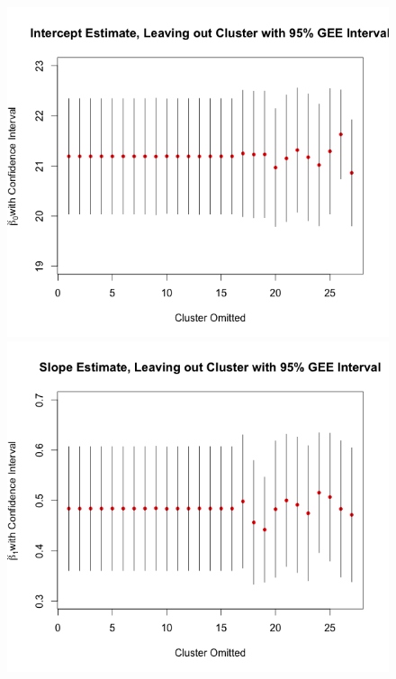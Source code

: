 \documentclass[11pt]{article}
\begin{document}
\begin{enumerate}
\begin{figure}[H]
			\includegraphics[scale=0.4]{RplotDDAR1GEEBeta0.png}
			\includegraphics[scale=0.4]{RplotDDAR1GEEBeta1.png}

\end{figure}
\end{enumerate}
\end{document}
